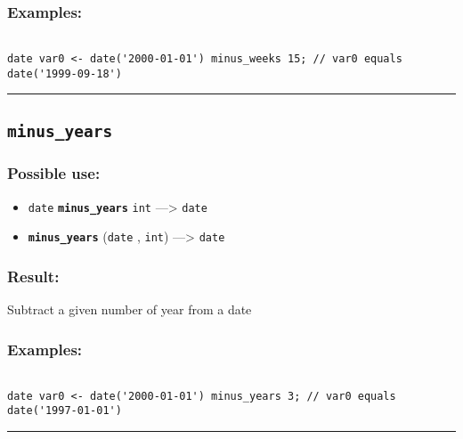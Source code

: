 \documentclass[]{book}
\providecommand{\tightlist}{%
  \setlength{\itemsep}{0pt}\setlength{\parskip}{0pt}}
\theoremstyle{definition}
\theoremstyle{definition}
\theoremstyle{definition}
\theoremstyle{remark}
\begin{document}
\subsubsection{Examples:}\label{examples-248}

\begin{verbatim}
 
date var0 <- date('2000-01-01') minus_weeks 15; // var0 equals date('1999-09-18')
\end{verbatim}

\begin{center}\rule{0.5\linewidth}{\linethickness}\end{center}

\subsection{\texorpdfstring{\texttt{minus\_years}}{minus\_years}}\label{minus_years}

\subsubsection{Possible use:}\label{possible-use-359}

\begin{itemize}
\tightlist
\item
  \texttt{date} \textbf{\texttt{minus\_years}} \texttt{int}
  ---\textgreater{} \texttt{date}
\item
  \textbf{\texttt{minus\_years}} (\texttt{date} , \texttt{int})
  ---\textgreater{} \texttt{date}
\end{itemize}

\subsubsection{Result:}\label{result-348}

Subtract a given number of year from a date

\subsubsection{Examples:}\label{examples-249}

\begin{verbatim}
 
date var0 <- date('2000-01-01') minus_years 3; // var0 equals date('1997-01-01')
\end{verbatim}

\begin{center}\rule{0.5\linewidth}{\linethickness}\end{center}
\end{document}
